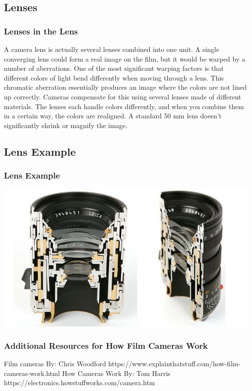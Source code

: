 \documentclass{beamer}
\begin{document}
\subsection{Lenses}		

\begin{frame}
	\frametitle{Lenses in the Lens}
	\begin{outline}
		\1 A camera lens is actually several lenses combined into one unit. 
		\2 A single converging lens could form a real image on the film, but it would be warped by a number of aberrations.
		\1 One of the most significant warping factors is that different colors of light bend differently when moving through a lens. 
		\2 This chromatic aberration essentially produces an image where the colors are not lined up correctly.
		\1 Cameras compensate for this using several lenses made of different materials. 
		\2 The lenses each handle colors differently, and when you combine them in a certain way, the colors are realigned.
		\1 A standard 50 mm lens doesn't significantly shrink or magnify the image.
	\end{outline}
\end{frame}

\subsection{Lens Example}		
\begin{frame}
	\frametitle{Lens Example}
	\begin{center}
		\includegraphics[width=1.0\textwidth]{images/a1e146ea393f65c4858f052816cf9d1d.jpg}
	\end{center}
\end{frame}
	
\begin{frame}
	\frametitle{Additional Resources for How Film Cameras Work}
	\begin{outline}
		\1 35mm Film cameras
		\2  By:  Chris Woodford
		\2 https://www.explainthatstuff.com/how-film-cameras-work.html
		\1 How Cameras Work
		\2  By:  Tom Harris
		\2 https://electronics.howstuffworks.com/camera.htm
	\end{outline}
\end{frame}
\end{document}
